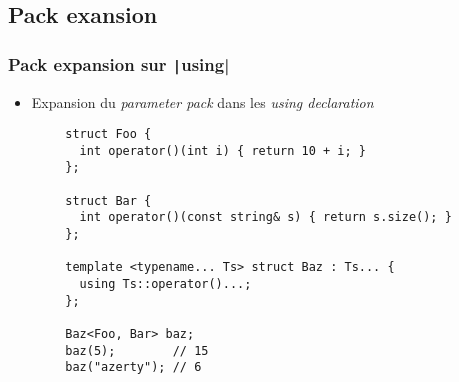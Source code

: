 \documentclass[C++.tex]{subfiles}
\begin{document}
\subsection*{Pack exansion}
\begin{frame}[fragile]
	\frametitle{Pack expansion sur \texttt|using|}
	\begin{itemize}
		\item Expansion du \textit{parameter pack} dans les \textit{using declaration}
	\end{itemize}

	\begin{verbatim}
		struct Foo {
		  int operator()(int i) { return 10 + i; }
		};

		struct Bar {
		  int operator()(const string& s) { return s.size(); }
		};

		template <typename... Ts> struct Baz : Ts... {
		  using Ts::operator()...;
		};

		Baz<Foo, Bar> baz;
		baz(5);        // 15
		baz("azerty"); // 6
	\end{verbatim}


\end{frame}
\end{document}
